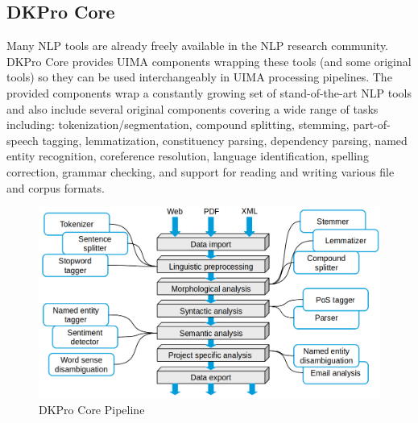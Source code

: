 \subsection{DKPro Core}
Many NLP tools are already freely available in the NLP research community. DKPro Core \cite{TUD-CS-2014-0864} provides UIMA components wrapping these tools (and some original tools) so they can be used interchangeably in UIMA processing pipelines. The provided components wrap a constantly growing set of stand-of-the-art NLP tools and also include several original components covering a wide range of tasks including: tokenization/segmentation, compound splitting, stemming, part-of-speech tagging, lemmatization, constituency parsing, dependency parsing, named entity recognition, coreference resolution, language identification, spelling correction, grammar checking, and support for reading and writing various file and corpus formats. 
\
\begin{figure}[ht]
    \centering
    \includegraphics[width=1\textwidth]{fig/dkpro-pipeline.png}
    \caption[Short caption]{DKPro Core Pipeline}
    \label{fig:dkpro-pipeline}
\end{figure}


